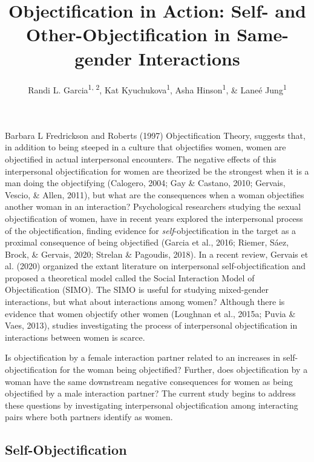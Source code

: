 \documentclass[man]{apa6}
\title{Objectification in Action: Self- and Other-Objectification in
Same-gender Interactions}
\author{Randi L. Garcia\textsuperscript{1, 2}, Kat
Kyuchukova\textsuperscript{1}, Asha Hinson\textsuperscript{1}, \& Laneé
Jung\textsuperscript{1}}
\date{}
\affiliation{
\vspace{0.5cm}
\textsuperscript{1} Department of Psychology, Smith College\\\textsuperscript{2} Program in Statistical and Data Sciences, Smith College}
\begin{document}
\maketitle

Barbara L Fredrickson and Roberts (1997) Objectification Theory,
suggests that, in addition to being steeped in a culture that
objectifies women, women are objectified in actual interpersonal
encounters. The negative effects of this interpersonal objectification
for women are theorized be the strongest when it is a man doing the
objectifying (Calogero, 2004; Gay \& Castano, 2010; Gervais, Vescio, \&
Allen, 2011), but what are the consequences when a woman objectifies
another woman in an interaction? Psychological researchers studying the
sexual objectification of women, have in recent years explored the
interpersonal process of the objectification, finding evidence for
\emph{self}-objectification in the target as a proximal consequence of
being objectified (Garcia et al., 2016; Riemer, Sáez, Brock, \& Gervais,
2020; Strelan \& Pagoudis, 2018). In a recent review, Gervais et al.
(2020) organized the extant literature on interpersonal
self-objectification and proposed a theoretical model called the Social
Interaction Model of Objectification (SIMO). The SIMO is useful for
studying mixed-gender interactions, but what about interactions among
women? Although there is evidence that women objectify other women
(Loughnan et al., 2015a; Puvia \& Vaes, 2013), studies investigating the
process of interpersonal objectification in interactions between women
is scarce.

Is objectification by a female interaction partner related to an
increases in self-objectification for the woman being objectified?
Further, does objectification by a woman have the same downstream
negative consequences for women as being objectified by a male
interaction partner? The current study begins to address these questions
by investigating interpersonal objectification among interacting pairs
where both partners identify as women.

\subsection{Self-Objectification}\label{self-objectification}
\end{document}
